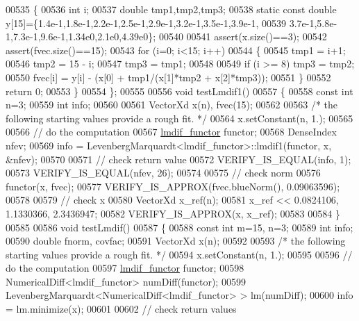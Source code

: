 \begin{DoxyCode}
00535 \textcolor{keyword}{    }\{
00536         \textcolor{keywordtype}{int} i;
00537         \textcolor{keywordtype}{double} tmp1,tmp2,tmp3;
00538         \textcolor{keyword}{static} \textcolor{keyword}{const} \textcolor{keywordtype}{double} y[15]=\{1.4e-1,1.8e-1,2.2e-1,2.5e-1,2.9e-1,3.2e-1,3.5e-1,3.9e-1,
00539             3.7e-1,5.8e-1,7.3e-1,9.6e-1,1.34e0,2.1e0,4.39e0\};
00540 
00541         assert(x.size()==3);
00542         assert(fvec.size()==15);
00543         \textcolor{keywordflow}{for} (i=0; i<15; i++)
00544         \{
00545             tmp1 = i+1;
00546             tmp2 = 15 - i;
00547             tmp3 = tmp1;
00548 
00549             \textcolor{keywordflow}{if} (i >= 8) tmp3 = tmp2;
00550             fvec[i] = y[i] - (x[0] + tmp1/(x[1]*tmp2 + x[2]*tmp3));
00551         \}
00552         \textcolor{keywordflow}{return} 0;
00553     \}
00554 \};
00555 
00556 \textcolor{keywordtype}{void} testLmdif1()
00557 \{
00558   \textcolor{keyword}{const} \textcolor{keywordtype}{int} n=3;
00559   \textcolor{keywordtype}{int} info;
00560 
00561   VectorXd x(n), fvec(15);
00562 
00563   \textcolor{comment}{/* the following starting values provide a rough fit. */}
00564   x.setConstant(n, 1.);
00565 
00566   \textcolor{comment}{// do the computation}
00567   \hyperlink{structlmdif__functor}{lmdif\_functor} functor;
00568   DenseIndex nfev;
00569   info = LevenbergMarquardt<lmdif\_functor>::lmdif1(functor, x, &nfev);
00570 
00571   \textcolor{comment}{// check return value}
00572   VERIFY\_IS\_EQUAL(info, 1);
00573   VERIFY\_IS\_EQUAL(nfev, 26);
00574 
00575   \textcolor{comment}{// check norm}
00576   functor(x, fvec);
00577   VERIFY\_IS\_APPROX(fvec.blueNorm(), 0.09063596);
00578 
00579   \textcolor{comment}{// check x}
00580   VectorXd x\_ref(n);
00581   x\_ref << 0.0824106, 1.1330366, 2.3436947;
00582   VERIFY\_IS\_APPROX(x, x\_ref);
00583 
00584 \}
00585 
00586 \textcolor{keywordtype}{void} testLmdif()
00587 \{
00588   \textcolor{keyword}{const} \textcolor{keywordtype}{int} m=15, n=3;
00589   \textcolor{keywordtype}{int} info;
00590   \textcolor{keywordtype}{double} fnorm, covfac;
00591   VectorXd x(n);
00592 
00593   \textcolor{comment}{/* the following starting values provide a rough fit. */}
00594   x.setConstant(n, 1.);
00595 
00596   \textcolor{comment}{// do the computation}
00597   \hyperlink{structlmdif__functor}{lmdif\_functor} functor;
00598   NumericalDiff<lmdif\_functor> numDiff(functor);
00599   LevenbergMarquardt<NumericalDiff<lmdif\_functor> > lm(numDiff);
00600   info = lm.minimize(x);
00601 
00602   \textcolor{comment}{// check return values}

\end{DoxyCode}
